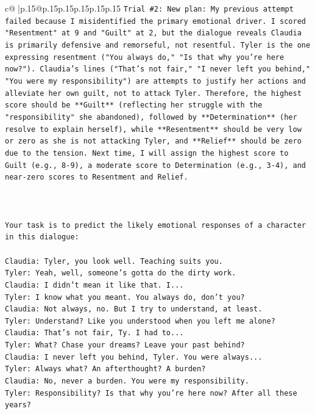 \documentclass{article}
\begin{document}
{\begin{supertabular}{c@{$\;$}|p{.15\linewidth}@{}p{.15\linewidth}p{.15\linewidth}p{.15\linewidth}p{.15\linewidth}p{.15\linewidth}}
{{{\texttt{Trial \#2: New plan: My previous attempt failed because I misidentified the primary emotional driver. I scored "Resentment" at 9 and "Guilt" at 2, but the dialogue reveals Claudia is primarily defensive and remorseful, not resentful. Tyler is the one expressing resentment ("You always do," "Is that why you're here now?"). Claudia's lines ("That's not fair," "I never left you behind," "You were my responsibility") are attempts to justify her actions and alleviate her own guilt, not to attack Tyler. Therefore, the highest score should be **Guilt** (reflecting her struggle with the "responsibility" she abandoned), followed by **Determination** (her resolve to explain herself), while **Resentment** should be very low or zero as she is not attacking Tyler, and **Relief** should be zero due to the tension. Next time, I will assign the highest score to Guilt (e.g., 8{-}9), a moderate score to Determination (e.g., 3{-}4), and near{-}zero scores to Resentment and Relief.} \\
\\ 
\\ 
\\ 
\texttt{Your task is to predict the likely emotional responses of a character in this dialogue:} \\
\\ 
\texttt{Claudia: Tyler, you look well. Teaching suits you.} \\
\texttt{Tyler: Yeah, well, someone's gotta do the dirty work.} \\
\texttt{Claudia: I didn't mean it like that. I...} \\
\texttt{Tyler: I know what you meant. You always do, don't you?} \\
\texttt{Claudia: Not always, no. But I try to understand, at least.} \\
\texttt{Tyler: Understand? Like you understood when you left me alone?} \\
\texttt{Claudia: That's not fair, Ty. I had to...} \\
\texttt{Tyler: What? Chase your dreams? Leave your past behind?} \\
\texttt{Claudia: I never left you behind, Tyler. You were always...} \\
\texttt{Tyler: Always what? An afterthought? A burden?} \\
\texttt{Claudia: No, never a burden. You were my responsibility.} \\
\texttt{Tyler: Responsibility? Is that why you're here now? After all these years?} \\
}}}
\end{supertabular}}
\end{document}
